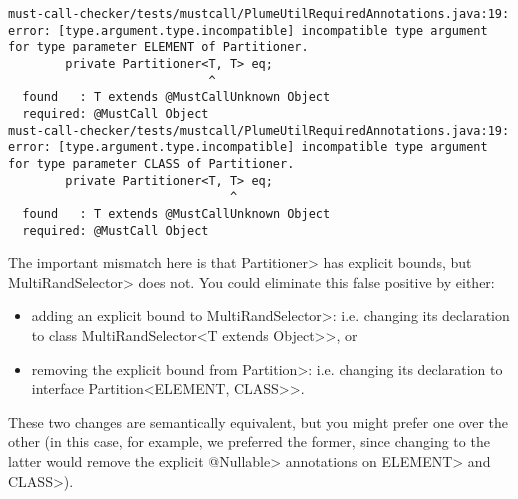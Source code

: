\begin{Verbatim}
must-call-checker/tests/mustcall/PlumeUtilRequiredAnnotations.java:19: error: [type.argument.type.incompatible] incompatible type argument for type parameter ELEMENT of Partitioner.
        private Partitioner<T, T> eq;
                            ^
  found   : T extends @MustCallUnknown Object
  required: @MustCall Object
must-call-checker/tests/mustcall/PlumeUtilRequiredAnnotations.java:19: error: [type.argument.type.incompatible] incompatible type argument for type parameter CLASS of Partitioner.
        private Partitioner<T, T> eq;
                               ^
  found   : T extends @MustCallUnknown Object
  required: @MustCall Object
\end{Verbatim}

The important mismatch here is that \<Partitioner> has explicit bounds, but \<MultiRandSelector>
does not. You could eliminate this false positive by either:
\begin{itemize}
\item adding an explicit bound to \<MultiRandSelector>: i.e. changing its declaration to \<class MultiRandSelector<T extends Object>>, or
\item removing the explicit bound from \<Partition>: i.e. changing its declaration to \<interface Partition<ELEMENT, CLASS>>.
\end{itemize}

These two changes are semantically equivalent, but you might prefer one over the other (in this case, for example,
we preferred the former, since changing to the latter would remove the explicit \<@Nullable> annotations on
\<ELEMENT> and \<CLASS>).
